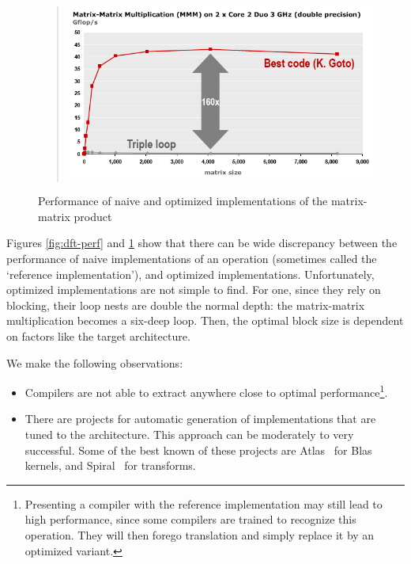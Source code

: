 \begin{figure}[ht]
  \begin{quote}
  \includegraphics[scale=.5]{graphics-public/gemm}
  \end{quote}
  \caption{Performance of naive and optimized implementations of the matrix-matrix product}
  \label{fig:gemm-perf}
\end{figure}

Figures \ref{fig:dft-perf} and \ref{fig:gemm-perf} show that there can
be wide discrepancy between the performance of naive implementations
of an operation (sometimes called the `reference implementation'), and
optimized implementations. Unfortunately, optimized implementations
are not simple to find. For one, since they rely on blocking, their
loop nests are double the normal depth: the matrix-matrix
multiplication becomes a six-deep loop. Then, the optimal block size
is dependent on factors like the target architecture.

We make the following observations:
\begin{itemize}
\item Compilers are not able to extract anywhere close
  to optimal performance\footnote{Presenting a compiler with the
    reference implementation may still lead to high performance, since
    some compilers are trained to recognize this operation. They will
    then forego translation and simply replace it by an optimized
    variant.}.
\item There are  projects for automatic
  generation of implementations that are tuned to the
  architecture. This approach can be moderately to very
  successful. Some of the best known of these projects are
  Atlas~\cite{atlas-parcomp} for Blas kernels, and
  Spiral~\cite{spiral} for transforms.
\end{itemize}

